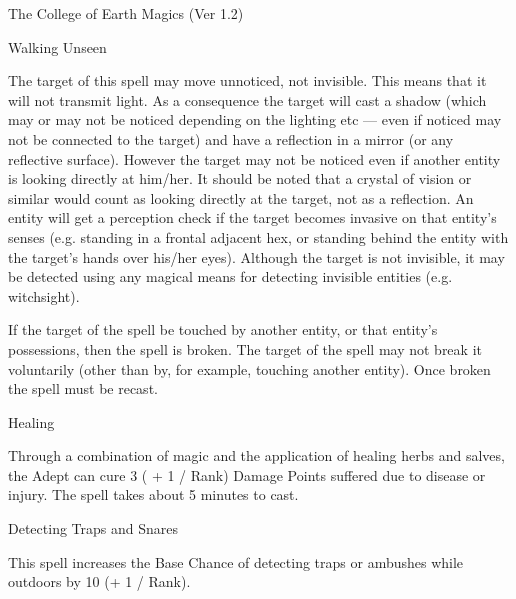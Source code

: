 \begin{Chapter}{The College of Earth Magics (Ver 1.2)}
\begin{spell}[G-5]{Walking Unseen}
\begin{effects}
The target of this spell may move unnoticed, not invisible.  This
means that it will not transmit light. As a consequence the target
will cast a shadow (which may or may not be noticed depending on the
lighting etc — even if noticed may not be connected to the target) and
have a reflection in a mirror (or any reflective surface).  However
the target may not be noticed even if another entity is looking
directly at him/her.  It should be noted that a crystal of vision or
similar would count as looking directly at the target, not as a
reflection.  An entity will get a perception check if the target
becomes invasive on that entity’s senses (e.g. standing in a frontal
adjacent hex, or standing behind the entity with the target’s hands
over his/her eyes). Although the target is not invisible, it may be
detected using any magical means for detecting invisible entities
(e.g. witchsight).

If the target of the spell be touched by another entity, or that
entity’s possessions, then the spell is broken.  The target of the
spell may not break it voluntarily (other than by, for example,
touching another entity).  Once broken the spell must be recast.

\end{effects}
\end{spell}

\begin{spell}[G-6]{Healing}
\begin{effects}
Through a combination of magic and the application of healing herbs
and salves, the Adept can cure 3 ( + 1 / Rank) Damage Points suffered
due to disease or injury.  The spell takes about 5 minutes to cast.
\end{effects}
\end{spell}

\begin{spell}[G-7]{Detecting Traps and Snares}

\begin{effects}
This spell increases the Base Chance of detecting traps or ambushes
while outdoors by 10 (+ 1 / Rank).
\end{effects}
\end{spell}


\end{Chapter}
